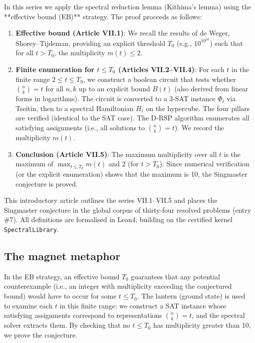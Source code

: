 \documentclass[11pt,a4paper]{article}
\begin{document}
In this series we apply the spectral reduction lemma (Kithima's lemma) using the **effective bound (EB)** strategy. The proof proceeds as follows:
\begin{enumerate}
\item \textbf{Effective bound (Article VII.1)}: We recall the results of de Weger, Shorey–Tijdeman, providing an explicit threshold \(T_0\) (e.g., \(10^{10^{10}}\)) such that for all \(t > T_0\), the multiplicity \(m(t) \le 2\).
\item \textbf{Finite enumeration for \(t \le T_0\) (Articles VII.2–VII.4)}: For each \(t\) in the finite range \(2 \le t \le T_0\), we construct a boolean circuit that tests whether \(\binom{n}{k}=t\) for all \(n,k\) up to an explicit bound \(B(t)\) (also derived from linear forms in logarithms). The circuit is converted to a 3‑SAT instance \(\Phi_t\) via Tseitin, then to a spectral Hamiltonian \(H_t\) on the hypercube. The four pillars are verified (identical to the SAT case). The D‑RSP algorithm enumerates all satisfying assignments (i.e., all solutions to \(\binom{n}{k}=t\)). We record the multiplicity \(m(t)\).
\item \textbf{Conclusion (Article VII.5)}: The maximum multiplicity over all \(t\) is the maximum of \(\max_{t \le T_0} m(t)\) and \(2\) (for \(t > T_0\)). Since numerical verification (or the explicit enumeration) shows that the maximum is 10, the Singmaster conjecture is proved.
\end{enumerate}
This introductory article outlines the series VII.1–VII.5 and places the Singmaster conjecture in the global corpus of thirty‑four resolved problems (entry \#7). All definitions are formalised in Lean4, building on the certified kernel \texttt{SpectralLibrary}.

\subsection{The magnet metaphor}

In the EB strategy, an effective bound \(T_0\) guarantees that any potential counterexample (i.e., an integer with multiplicity exceeding the conjectured bound) would have to occur for some \(t \le T_0\). The lantern (ground state) is used to examine each \(t\) in this finite range: we construct a SAT instance whose satisfying assignments correspond to representations \(\binom{n}{k}=t\), and the spectral solver extracts them. By checking that no \(t \le T_0\) has multiplicity greater than 10, we prove the conjecture.
\end{document}
